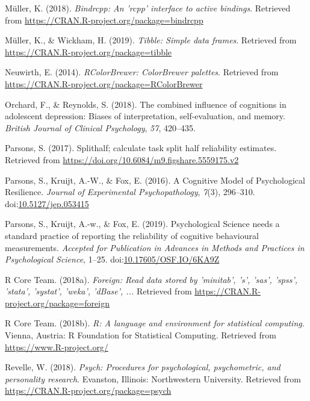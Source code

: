 \documentclass[man,floatsintext]{apa6}
\begin{document}
\leavevmode\hypertarget{ref-R-bindrcpp}{}%
Müller, K. (2018). \emph{Bindrcpp: An 'rcpp' interface to active bindings}. Retrieved from \url{https://CRAN.R-project.org/package=bindrcpp}

\leavevmode\hypertarget{ref-R-tibble}{}%
Müller, K., \& Wickham, H. (2019). \emph{Tibble: Simple data frames}. Retrieved from \url{https://CRAN.R-project.org/package=tibble}

\leavevmode\hypertarget{ref-R-RColorBrewer}{}%
Neuwirth, E. (2014). \emph{RColorBrewer: ColorBrewer palettes}. Retrieved from \url{https://CRAN.R-project.org/package=RColorBrewer}

\leavevmode\hypertarget{ref-orchard_combined_2018}{}%
Orchard, F., \& Reynolds, S. (2018). The combined influence of cognitions in adolescent depression: Biases of interpretation, self-evaluation, and memory. \emph{British Journal of Clinical Psychology}, \emph{57}, 420--435.

\leavevmode\hypertarget{ref-R-splithalf}{}%
Parsons, S. (2017). Splithalf; calculate task split half reliability estimates. Retrieved from \url{https://doi.org/10.6084/m9.figshare.5559175.v2}

\leavevmode\hypertarget{ref-Parsons2016}{}%
Parsons, S., Kruijt, A.-W., \& Fox, E. (2016). A Cognitive Model of Psychological Resilience. \emph{Journal of Experimental Psychopathology}, \emph{7}(3), 296--310. doi:\href{https://doi.org/10.5127/jep.053415}{10.5127/jep.053415}

\leavevmode\hypertarget{ref-Parsons2019}{}%
Parsons, S., Kruijt, A.-w., \& Fox, E. (2019). Psychological Science needs a standard practice of reporting the reliability of cognitive behavioural measurements. \emph{Accepted for Publication in Advances in Methods and Practices in Psychological Science}, 1--25. doi:\href{https://doi.org/10.17605/OSF.IO/6KA9Z}{10.17605/OSF.IO/6KA9Z}

\leavevmode\hypertarget{ref-R-foreign}{}%
R Core Team. (2018a). \emph{Foreign: Read data stored by 'minitab', 's', 'sas', 'spss', 'stata', 'systat', 'weka', 'dBase', ...} Retrieved from \url{https://CRAN.R-project.org/package=foreign}

\leavevmode\hypertarget{ref-R-base}{}%
R Core Team. (2018b). \emph{R: A language and environment for statistical computing}. Vienna, Austria: R Foundation for Statistical Computing. Retrieved from \url{https://www.R-project.org/}

\leavevmode\hypertarget{ref-R-psych}{}%
Revelle, W. (2018). \emph{Psych: Procedures for psychological, psychometric, and personality research}. Evanston, Illinois: Northwestern University. Retrieved from \url{https://CRAN.R-project.org/package=psych}
\end{document}

